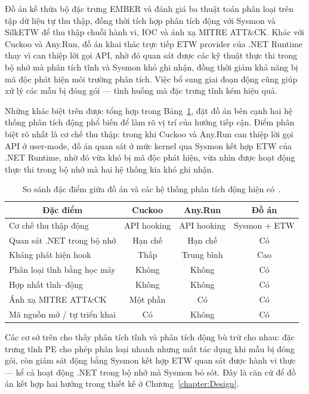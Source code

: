 \documentclass[../DoAn.tex]{subfiles}
\begin{document}
Đồ án kế thừa bộ đặc trưng EMBER và đánh giá ba thuật toán phân loại
trên tập dữ liệu tự thu thập, đồng thời tích hợp phân tích động với
Sysmon và SilkETW để thu thập chuỗi hành vi, IOC và ánh xạ MITRE
ATT\&CK. Khác với Cuckoo và Any.Run, đồ án khai thác trực tiếp ETW
provider của .NET Runtime thay vì can thiệp lời gọi API, nhờ đó quan
sát được các kỹ thuật thực thi trong bộ nhớ mà phân tích tĩnh và Sysmon
khó ghi nhận, đồng thời giảm khả năng bị mã độc phát hiện môi trường
phân tích. Việc bổ sung giai đoạn động cũng giúp xử lý các mẫu bị đóng
gói — tình huống mà đặc trưng tĩnh kém hiệu quả.

Những khác biệt trên được tổng hợp trong Bảng~\ref{tab:related-comparison},
đặt đồ án bên cạnh hai hệ thống phân tích động phổ biến để làm rõ vị trí
của hướng tiếp cận. Điểm phân biệt rõ nhất là cơ chế thu thập: trong khi
Cuckoo và Any.Run can thiệp lời gọi API ở user-mode, đồ án quan sát ở mức
kernel qua Sysmon kết hợp ETW của .NET Runtime, nhờ đó vừa khó bị mã độc
phát hiện, vừa nhìn được hoạt động thực thi trong bộ nhớ mà hai hệ thống
kia khó ghi nhận.
\begin{table}[H]
\centering
\setlength{\tabcolsep}{4pt}
\caption{So sánh đặc điểm giữa đồ án và các hệ thống phân tích động
  hiện có~\cite{gibert2020}.}
\label{tab:related-comparison}
\begin{tabular}{|p{4.6cm}|c|c|c|}
\hline
\multicolumn{1}{|c|}{\textbf{Đặc điểm}} & \multicolumn{1}{c|}{\textbf{Cuckoo}} & \multicolumn{1}{c|}{\textbf{Any.Run}} & \multicolumn{1}{c|}{\textbf{Đồ án}} \\
\hline
Cơ chế thu thập động & API hooking & API hooking & Sysmon + ETW \\
\hline
Quan sát .NET trong bộ nhớ & Hạn chế & Hạn chế & Có \\
\hline
Kháng phát hiện hook & Thấp & Trung bình & Cao \\
\hline
Phân loại tĩnh bằng học máy & Không & Không & Có \\
\hline
Hợp nhất tĩnh--động & Không & Không & Có \\
\hline
Ánh xạ MITRE ATT\&CK & Một phần & Có & Có \\
\hline
Mã nguồn mở / tự triển khai & Có & Không & Có \\
\hline
\end{tabular}
\end{table}
Các cơ sở trên cho thấy phân tích tĩnh và phân tích động bù trừ cho
nhau: đặc trưng tĩnh PE cho phép phân loại nhanh nhưng mất tác dụng khi
mẫu bị đóng gói, còn giám sát động bằng Sysmon kết hợp ETW quan sát
được hành vi thực --- kể cả hoạt động .NET trong bộ nhớ mà Sysmon bỏ
sót. Đây là căn cứ để đồ án kết hợp hai hướng trong thiết kế ở
Chương~\ref{chapter:Design}.
\end{document}
